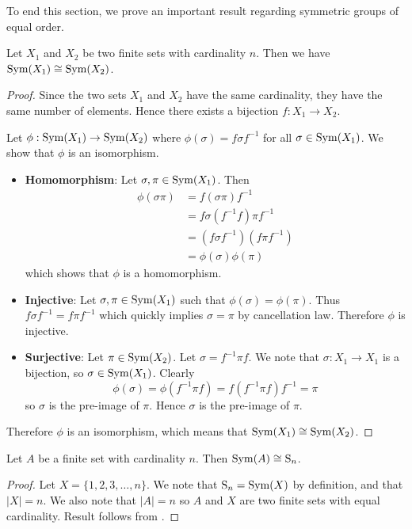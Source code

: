 To end this section, we prove an important result regarding symmetric groups of equal order.
\begin{theorem}\label{thrm-symmetric-groups-of-same-order-are-isomorphic}
    Let $X_1$ and $X_2$ be two finite sets with cardinality $n$. Then we have $\mathrm{Sym}(X_1) \cong \mathrm{Sym}(X_2)$.
\end{theorem}
\begin{proof}
    Since the two sets $X_1$ and $X_2$ have the same cardinality, they have the same number of elements. Hence there exists a bijection $f: X_1 \to X_2$.

    Let $\phi: \mathrm{Sym}(X_1) \to \mathrm{Sym}(X_2)$ where $\phi(\sigma) = f\sigma f^{-1}$ for all $\sigma \in \mathrm{Sym}(X_1)$. We show that $\phi$ is an isomorphism.
    \begin{itemize}
        \item \textbf{Homomorphism}: Let $\sigma, \pi \in \mathrm{Sym}(X_1)$. Then
        \begin{align*}
            \phi(\sigma\pi) &= f(\sigma\pi)f^{-1}\\
            &= f\sigma(f^{-1}f)\pi f^{-1}\\
            &= (f\sigma f^{-1})(f\pi f^{-1})\\
            &= \phi(\sigma)\phi(\pi)
        \end{align*}
        which shows that $\phi$ is a homomorphism.

        \item \textbf{Injective}: Let $\sigma, \pi \in \mathrm{Sym}(X_1)$ such that $\phi(\sigma) = \phi(\pi)$. Thus $f\sigma f^{-1} = f\pi f^{-1}$ which quickly implies $\sigma = \pi$ by cancellation law. Therefore $\phi$ is injective.

        \item \textbf{Surjective}: Let $\pi \in \mathrm{Sym}(X_2)$. Let $\sigma = f^{-1}\pi f$. We note that $\sigma: X_1 \to X_1$ is a bijection, so $\sigma \in \mathrm{Sym}(X_1)$. Clearly
        \[
            \phi(\sigma) = \phi(f^{-1}\pi f) = f(f^{-1}\pi f)f^{-1} = \pi
        \]
        so $\sigma$ is the pre-image of $\pi$. Hence $\sigma$ is the pre-image of $\pi$.
    \end{itemize}
    Therefore $\phi$ is an isomorphism, which means that $\mathrm{Sym}(X_1) \cong \mathrm{Sym}(X_2)$.
\end{proof}

\begin{corollary}\label{corollary-symmetric-group-of-finite-order}
    Let $A$ be a finite set with cardinality $n$. Then $\mathrm{Sym}(A) \cong \mathrm{S}_{n}$.
\end{corollary}
\begin{proof}
    Let $X = \{1, 2, 3, \dots, n\}$. We note that $\mathrm{S}_{n} = \mathrm{Sym}(X)$ by definition, and that $|X| = n$. We also note that $|A| = n$ so $A$ and $X$ are two finite sets with equal cardinality. Result follows from .
\end{proof}

